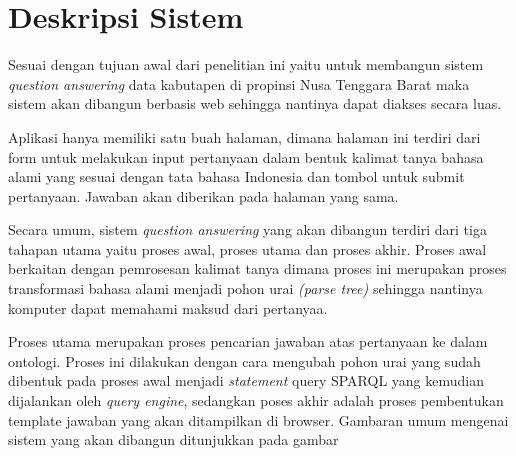 \section{Deskripsi Sistem}
Sesuai dengan tujuan awal dari penelitian ini yaitu untuk membangun sistem \emph{question answering} data kabutapen di propinsi Nusa Tenggara Barat maka sistem akan dibangun berbasis web sehingga nantinya dapat diakses secara luas.

Aplikasi hanya memiliki satu buah halaman, dimana halaman ini terdiri dari form untuk melakukan input pertanyaan dalam bentuk kalimat tanya bahasa alami yang sesuai dengan tata bahasa Indonesia dan tombol untuk submit pertanyaan. Jawaban akan diberikan pada halaman yang sama.

Secara umum, sistem \emph{question answering} yang akan dibangun terdiri dari tiga tahapan utama yaitu proses awal, proses utama dan proses akhir. Proses awal berkaitan dengan pemrosesan kalimat tanya dimana proses ini merupakan proses transformasi bahasa alami menjadi pohon urai \emph{(parse tree)} sehingga nantinya komputer dapat memahami maksud dari pertanyaa.

Proses utama merupakan proses pencarian jawaban atas pertanyaan ke dalam ontologi. Proses ini dilakukan dengan cara mengubah pohon urai yang sudah dibentuk pada proses awal menjadi \emph{statement} query SPARQL yang kemudian dijalankan oleh \emph{query engine}, sedangkan poses akhir adalah proses pembentukan template jawaban yang akan ditampilkan di browser. Gambaran umum mengenai sistem yang akan dibangun ditunjukkan pada gambar
